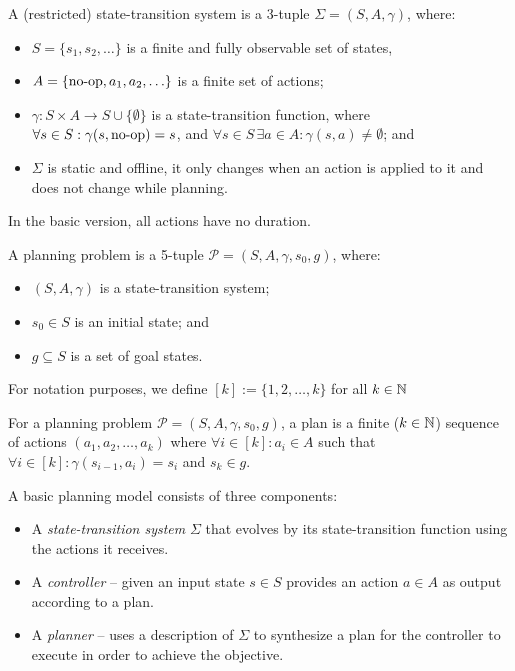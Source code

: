 \begin{defn}\label{defn:state-transition-sys}
A (restricted) state-transition system is a 3-tuple $\Sigma = (S, A, \gamma)$, where:
\begin{itemize}
\item $S = \{s_1, s_2, \ldots\}$ is a finite and fully observable set of states,
\item $A = \{\operatorname{\textrm{no-op}}, a_1, a_2, \ldots\}$ is a finite set of actions;
\item $\gamma: S \times A \to S \cup \{\emptyset\}$ is a state-transition function,
where $\forall s \in S : \gamma(s, \operatorname{\textrm{no-op}}) = s$,
and $\forall s \in S\,\exists a \in A : \gamma(s, a) \neq \emptyset$; and
\item $\Sigma$ is static and offline,
it only changes when an action is applied to it and does not change while planning.
\end{itemize}
In the basic version, all actions have no duration.
\end{defn}

\noindent {}

\begin{defn}\label{defn:planning-problem}\cite[Part~I]{Ghallab2004}
A planning problem is a 5-tuple $\mathcal{P} = (S, A, \gamma, s_0, g)$, where:
\begin{itemize}
\item $(S, A, \gamma)$ is a state-transition system;
\item $s_0 \in S$ is an initial state; and
\item $g \subseteq S$ is a set of goal states.
\end{itemize}
\end{defn}

\noindent For notation purposes, we define $[k] := \{1, 2, \ldots, k\}$ for all $k \in \mathbb{N}$

\begin{defn}[Plan]\label{defn:plan}\cite[Section~1.5]{Ghallab2004}
For a planning problem $\mathcal{P} = (S, A, \gamma, s_0, g)$,
a plan is a finite ($k \in \mathbb{N}$) sequence of actions $(a_1, a_2, \ldots, a_k)$ where
$\forall i \in [k] : a_i \in A$ such that
$\forall i \in [k] : \gamma(s_{i-1}, a_i) = s_i$ and $s_k \in g$.
\end{defn}

\noindent A basic planning model consists of three components:

\begin{itemize}
\item A \textit{state-transition system} $\Sigma$ that evolves by its state-transition function using the actions
it receives.
\item A \textit{controller} -- given an input state $s \in S$ provides an action $a \in A$ as output according
to a plan.
\item A \textit{planner} -- uses a description of $\Sigma$ to synthesize a plan for the controller
to execute in order to achieve the objective.
\end{itemize}

